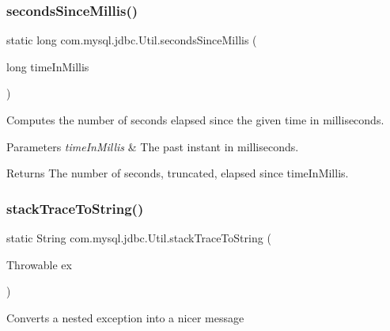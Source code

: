 \subsubsection{\texorpdfstring{seconds\+Since\+Millis()}{secondsSinceMillis()}}
{\footnotesize\ttfamily static long com.\+mysql.\+jdbc.\+Util.\+seconds\+Since\+Millis (\begin{DoxyParamCaption}\item[{long}]{time\+In\+Millis }\end{DoxyParamCaption})\hspace{0.3cm}{\ttfamily [static]}}

Computes the number of seconds elapsed since the given time in milliseconds.


\begin{DoxyParams}{Parameters}
{\em time\+In\+Millis} & The past instant in milliseconds. \\
\hline
\end{DoxyParams}
\begin{DoxyReturn}{Returns}
The number of seconds, truncated, elapsed since time\+In\+Millis. 
\end{DoxyReturn}
\mbox{\label{classcom_1_1mysql_1_1jdbc_1_1_util_a1354e3d746b6b93b38b8d535acd977a4}} 
\subsubsection{\texorpdfstring{stack\+Trace\+To\+String()}{stackTraceToString()}}
{\footnotesize\ttfamily static String com.\+mysql.\+jdbc.\+Util.\+stack\+Trace\+To\+String (\begin{DoxyParamCaption}\item[{Throwable}]{ex }\end{DoxyParamCaption})\hspace{0.3cm}{\ttfamily [static]}}

Converts a nested exception into a nicer message


